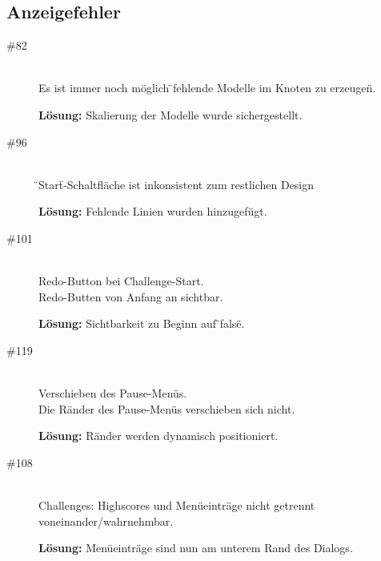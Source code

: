 %



\subsection*{Anzeigefehler}
\begin{description}


\item[\#82] \hfill \\
Es ist immer noch möglich \"{}fehlende Modelle im Knoten zu erzeugen\"{}.

{\bfseries Lösung:} Skalierung der Modelle wurde sichergestellt.

\item[\#96] \hfill \\
\"{}Start\"{}-Schaltfläche ist inkonsistent zum restlichen Design

{\bfseries Lösung:} Fehlende Linien wurden hinzugefügt.

 \item[\#101] \hfill \\
 Redo-Button bei Challenge-Start.\\
 Redo-Butten von Anfang an sichtbar.
 
 {\bfseries Lösung:} Sichtbarkeit zu Beginn auf \"{}false\"{}.
 
\item[\#119] \hfill \\
Verschieben des Pause-Menüs. \\
Die Ränder des Pause-Menüs verschieben sich nicht.

{\bfseries Lösung:} Ränder werden dynamisch positioniert. 

 

\item[\#108] \hfill \\
 Challenges: Highscores und Menüeinträge nicht getrennt
  voneinander/wahrnehmbar.
 
 {\bfseries Lösung:} Menüeinträge sind nun am unterem Rand des Dialogs.
 
\end{description}
~\\


